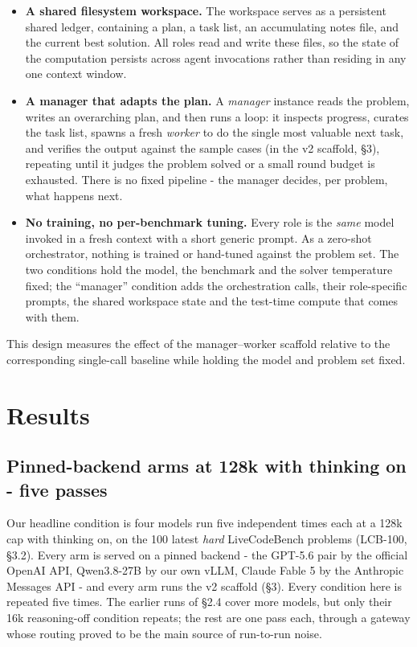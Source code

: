 \documentclass[11pt]{article}
\begin{document}
\begin{itemize}
  \item \textbf{A shared filesystem workspace.} The workspace serves as a
  persistent shared ledger, containing a plan, a task list, an accumulating
  notes file, and the current best solution. All roles read and write these
  files, so the state of the computation persists across agent invocations
  rather than residing in any one context window.

  \item \textbf{A manager that adapts the plan.} A \textit{manager} instance reads the
  problem, writes an overarching plan, and then runs a loop: it inspects progress, curates
  the task list, spawns a fresh \textit{worker} to do the single most valuable next task,
  and verifies the output against the sample cases (in the v2 scaffold, \S3), repeating
  until it judges the problem solved or a small round budget is exhausted. There is no
  fixed pipeline - the manager decides, per problem, what happens next.

  \item \textbf{No training, no per-benchmark tuning.} Every role is the \textit{same}
  model invoked in a fresh context with a short generic prompt. As a zero-shot orchestrator,
  nothing is trained or hand-tuned against the problem set. The two conditions hold the model, the benchmark and
  the solver temperature fixed; the ``manager'' condition adds the orchestration calls,
  their role-specific prompts, the shared workspace state and the test-time compute that
  comes with them.
\end{itemize}

This design measures the effect of the manager--worker scaffold relative to the
corresponding single-call baseline while holding the model and problem set fixed.
\section{Results}

\subsection{Pinned-backend arms at 128k with thinking on - five passes}

Our headline condition is four models run five independent times each at a 128k cap with
thinking on, on the 100 latest \textit{hard} LiveCodeBench problems (LCB-100, \S3.2).
Every arm is served on a pinned backend - the GPT-5.6 pair by the official
OpenAI API, Qwen3.8-27B by our own vLLM, Claude Fable 5 by the Anthropic Messages API -
and every arm runs the v2 scaffold (\S3). Every condition here is repeated five times. The
earlier runs of \S2.4 cover more models, but only their 16k reasoning-off condition repeats;
the rest are one pass each, through a gateway whose routing proved to be the main source of
run-to-run noise.
\end{document}
